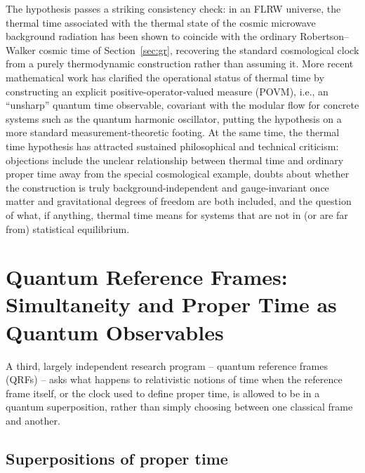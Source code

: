 \documentclass[11pt]{article}
\begin{document}
The hypothesis passes a striking consistency check: in an FLRW universe, the thermal time associated with the thermal state of the cosmic microwave background radiation has been shown to coincide with the ordinary Robertson--Walker cosmic time of Section~\ref{sec:gr}, recovering the standard cosmological clock from a purely thermodynamic construction rather than assuming it. More recent mathematical work has clarified the operational status of thermal time by constructing an explicit positive-operator-valued measure (POVM), i.e., an ``unsharp'' quantum time observable, covariant with the modular flow for concrete systems such as the quantum harmonic oscillator, putting the hypothesis on a more standard measurement-theoretic footing. At the same time, the thermal time hypothesis has attracted sustained philosophical and technical criticism: objections include the unclear relationship between thermal time and ordinary proper time away from the special cosmological example, doubts about whether the construction is truly background-independent and gauge-invariant once matter and gravitational degrees of freedom are both included, and the question of what, if anything, thermal time means for systems that are not in (or are far from) statistical equilibrium.

\section{Quantum Reference Frames: Simultaneity and Proper Time as Quantum Observables}
\label{sec:qrf}

A third, largely independent research program -- quantum reference frames (QRFs) -- asks what happens to relativistic notions of time when the reference frame itself, or the clock used to define proper time, is allowed to be in a quantum superposition, rather than simply choosing between one classical frame and another.

\subsection{Superpositions of proper time}
\end{document}
